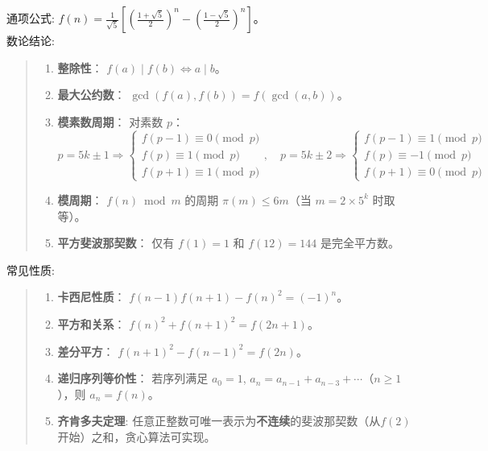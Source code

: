 \documentclass[a4paper,12pt]{article}
\begin{document}
\noindent 通项公式: 
\(
f(n) = \frac{1}{\sqrt{5}} \left[ \left( \frac{1 + \sqrt{5}}{2} \right)^n - \left( \frac{1 - \sqrt{5}}{2} \right)^n \right]
\)。\\

\noindent 数论结论:

\begin{quote}
\begin{enumerate}
    \item \textbf{整除性}：
    \(f(a) \mid f(b) \iff a \mid b\)。
    
    \item \textbf{最大公约数}：
    \(\gcd(f(a), f(b)) = f(\gcd(a,b))\)。
    
    \item \textbf{模素数周期}：
    对素数 \(p\)：
    \[
    p = 5k \pm 1 \Rightarrow 
    \begin{cases}
        f(p-1) \equiv 0 \pmod{p} \\
        f(p) \equiv 1 \pmod{p} \\
        f(p+1) \equiv 1 \pmod{p}
    \end{cases}, \quad
    p = 5k \pm 2 \Rightarrow 
    \begin{cases}
        f(p-1) \equiv 1 \pmod{p} \\
        f(p) \equiv -1 \pmod{p} \\
        f(p+1) \equiv 0 \pmod{p}
    \end{cases}
    \]
    
    \item \textbf{模周期}：
    \(f(n) \bmod m\) 的周期 \(\pi(m) \leq 6m\)（当 \(m = 2 \times 5^k\) 时取等）。
    
    \item \textbf{平方斐波那契数}：
    仅有 \(f(1) = 1\) 和 \(f(12) = 144\) 是完全平方数。
\end{enumerate} 
\end{quote}

\noindent 常见性质:
\begin{quote}
\begin{enumerate}
    \item \textbf{卡西尼性质}： 
    \(f(n-1) f(n+1) - f(n)^2 = (-1)^n\)。
    
    \item \textbf{平方和关系}：
    \(f(n)^2 + f(n+1)^2 = f(2n+1)\)。
    
    \item \textbf{差分平方}：
    \(f(n+1)^2 - f(n-1)^2 = f(2n)\)。
    
    \item \textbf{递归序列等价性}：
    若序列满足 \(a_0 = 1\), \(a_n = a_{n-1} + a_{n-3} + \cdots\)（\(n \geq 1\)），则 \(a_n = f(n)\)。   
    \item \textbf{齐肯多夫定理}:
    任意正整数可唯一表示为\textbf{不连续}的斐波那契数（从\(f(2)\)开始）之和，贪心算法可实现。
\end{enumerate}    
\end{quote}
\end{document}
